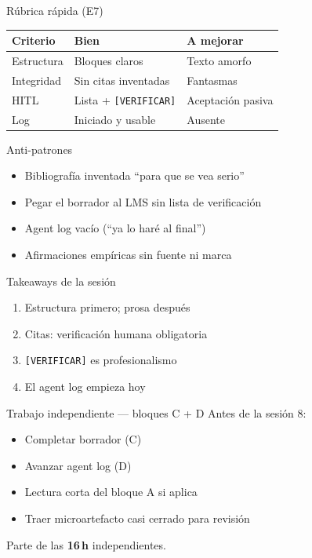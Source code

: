 \documentclass[aspectratio=169,11pt]{beamer}
\begin{document}
\begin{frame}{Rúbrica rápida (E7)}
\begin{tabularx}{\textwidth}{@{}lXX@{}}
\toprule
Criterio & Bien & A mejorar \\
\midrule
Estructura & Bloques claros & Texto amorfo \\
Integridad & Sin citas inventadas & Fantasmas \\
HITL & Lista + \texttt{[VERIFICAR]} & Aceptación pasiva \\
Log & Iniciado y usable & Ausente \\
\bottomrule
\end{tabularx}
\end{frame}

\begin{frame}{Anti-patrones}
\begin{itemize}
\item Bibliografía inventada ``para que se vea serio''
\item Pegar el borrador al LMS sin lista de verificación
\item Agent log vacío (``ya lo haré al final'')
\item Afirmaciones empíricas sin fuente ni marca
\end{itemize}
\end{frame}

\begin{frame}{Takeaways de la sesión}
\begin{enumerate}
\item Estructura primero; prosa después
\item Citas: verificación humana obligatoria
\item \texttt{[VERIFICAR]} es profesionalismo
\item El agent log empieza hoy
\end{enumerate}
\end{frame}

\begin{frame}{Trabajo independiente --- bloques C + D}
Antes de la sesión 8:
\begin{itemize}
\item Completar borrador (C)
\item Avanzar agent log (D)
\item Lectura corta del bloque A si aplica
\item Traer microartefacto casi cerrado para revisión
\end{itemize}
Parte de las \textbf{16\,h} independientes.
\end{frame}
\end{document}
